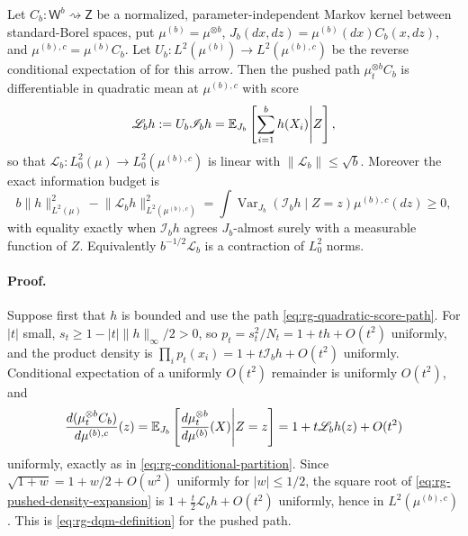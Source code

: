 Let \(C_b:\mathsf W^b\rightsquigarrow\mathsf Z\) be a normalized,
parameter-independent Markov kernel between standard-Borel spaces, put
\(\mu^{(b)}=\mu^{\otimes b}\),
\(J_b(dx,dz)=\mu^{(b)}(dx)C_b(x,dz)\), and
\(\mu^{(b),c}=\mu^{(b)}C_b\).  Let
\(U_b:L^2(\mu^{(b)})\to L^2(\mu^{(b),c})\) be the reverse conditional
expectation of  for this arrow.  Then the
pushed path \(\mu_t^{\otimes b}C_b\) is differentiable in quadratic mean at
\(\mu^{(b),c}\) with score
\begin{equation}
 \mathscr L_bh:=U_b\mathscr I_bh
 =\mathbb E_{J_b}\left[\sum_{i=1}^bh(X_i) \middle| Z\right],
 \label{eq:rg-score-renormalization-operator}
\end{equation}
so that \(\mathscr L_b:L^2_0(\mu)\to L^2_0(\mu^{(b),c})\) is linear with
\(\lVert\mathscr L_b\rVert\leq\sqrt b\).  Moreover the exact information budget
is
\begin{equation}
 b\lVert h\rVert_{L^2(\mu)}^2
 -\lVert\mathscr L_bh\rVert_{L^2(\mu^{(b),c})}^2
 =\int\operatorname{Var}_{J_b}\left(\mathscr I_bh \middle| Z=z\right)
 \mu^{(b),c}(dz)
 \geq0,
 \label{eq:rg-extensive-fisher-defect}
\end{equation}
with equality exactly when \(\mathscr I_bh\) agrees \(J_b\)-almost surely with a
measurable function of \(Z\).  Equivalently
\(b^{-1/2}\mathscr L_b\) is a contraction of \(L^2_0\) norms.

\paragraph{Proof.}
Suppose first that \(h\) is bounded and use the path
\eqref{eq:rg-quadratic-score-path}.  For \(\lvert t\rvert\) small,
\(s_t\geq1-\lvert t\rvert\lVert h\rVert_\infty/2>0\), so
\(p_t=s_t^2/N_t=1+th+O(t^2)\) uniformly, and the product density is
\(\prod_ip_t(x_i)=1+t\mathscr I_bh+O(t^2)\) uniformly.  Conditional expectation
of a uniformly \(O(t^2)\) remainder is uniformly \(O(t^2)\), and
\begin{equation}
 \frac{d(\mu_t^{\otimes b}C_b)}{d\mu^{(b),c}}(z)
 =\mathbb E_{J_b}\left[
 \frac{d\mu_t^{\otimes b}}{d\mu^{(b)}}(X) \middle| Z=z\right]
 =1+t\mathscr L_bh(z)+O(t^2)
 \label{eq:rg-pushed-density-expansion}
\end{equation}
uniformly, exactly as in \eqref{eq:rg-conditional-partition}.  Since
\(\sqrt{1+w}=1+w/2+O(w^2)\) uniformly for \(\lvert w\rvert\leq1/2\), the square
root of \eqref{eq:rg-pushed-density-expansion} is
\(1+\tfrac t2\mathscr L_bh+O(t^2)\) uniformly, hence in
\(L^2(\mu^{(b),c})\).  This is \eqref{eq:rg-dqm-definition} for the pushed path.

